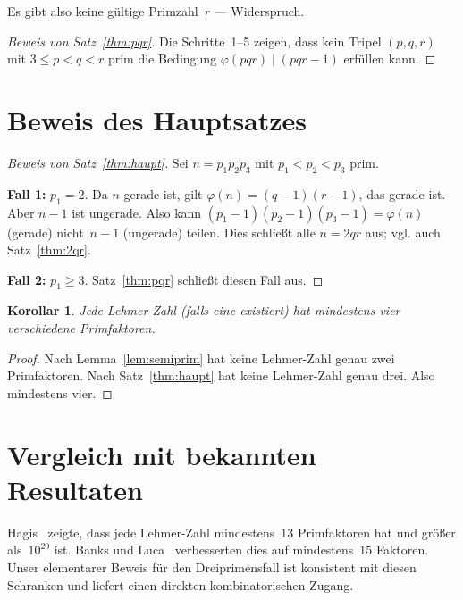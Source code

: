 \documentclass[12pt,a4paper]{amsart}
\newtheorem{corollary}[theorem]{Korollar}
\theoremstyle{definition}
\newcommand{\euler}{\varphi}
\begin{document}
Es gibt also keine gültige Primzahl~$r$ — Widerspruch.

\begin{proof}[Beweis von Satz~\ref{thm:pqr}]
Die Schritte~1--5 zeigen, dass kein Tripel $(p, q, r)$ mit $3 \le p < q < r$
prim die Bedingung $\euler(pqr) \mid (pqr - 1)$ erfüllen kann. \qedhere
\end{proof}

\section{Beweis des Hauptsatzes}

\begin{proof}[Beweis von Satz~\ref{thm:haupt}]
Sei $n = p_1 p_2 p_3$ mit $p_1 < p_2 < p_3$ prim.

\textbf{Fall 1:} $p_1 = 2$. Da $n$ gerade ist, gilt $\euler(n) = (q-1)(r-1)$, das gerade ist.
Aber $n - 1$ ist ungerade. Also kann $(p_1-1)(p_2-1)(p_3-1) = \euler(n)$ (gerade) nicht~$n-1$ (ungerade) teilen.
Dies schließt alle $n = 2qr$ aus; vgl. auch Satz~\ref{thm:2qr}.

\textbf{Fall 2:} $p_1 \ge 3$. Satz~\ref{thm:pqr} schließt diesen Fall aus.
\end{proof}

\begin{corollary}
\label{cor:vierprim}
Jede Lehmer-Zahl (falls eine existiert) hat mindestens \emph{vier}
verschiedene Primfaktoren.
\end{corollary}

\begin{proof}
Nach Lemma~\ref{lem:semiprim} hat keine Lehmer-Zahl genau zwei Primfaktoren.
Nach Satz~\ref{thm:haupt} hat keine Lehmer-Zahl genau drei. Also mindestens vier.
\end{proof}

\section{Vergleich mit bekannten Resultaten}

Hagis~\cite{Hagis1988} zeigte, dass jede Lehmer-Zahl mindestens~$13$ Primfaktoren
hat und größer als~$10^{20}$ ist. Banks und Luca~\cite{Banks2009} verbesserten dies
auf mindestens~$15$ Faktoren. Unser elementarer Beweis für den Dreiprimensfall ist
konsistent mit diesen Schranken und liefert einen direkten kombinatorischen Zugang.
\end{document}
